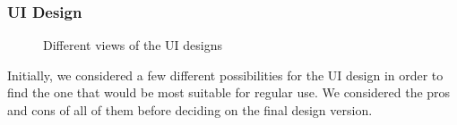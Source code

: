 \documentclass[11pt, a4paper]{article}
\begin{document}
\subsubsection{UI Design}
\begin{figure}[h!]
\centering
{}
\quad
{}
\caption{Different views of the UI designs}
\end{figure}

Initially, we considered a few different possibilities for the UI design in order to find the one that would be most suitable for regular use. We considered the pros and cons of all of them before deciding on the final design version. 
\end{document}
